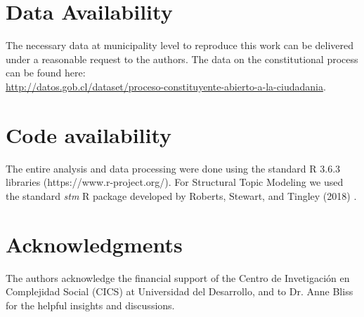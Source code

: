 \documentclass[onecolumn]{article}
\begin{document}




\section*{Data Availability}
The necessary data at municipality level to reproduce this work can be delivered under a reasonable request to the authors. The data on the constitutional process can be found here:\\ \url{http://datos.gob.cl/dataset/proceso-constituyente-abierto-a-la-ciudadania}.

\section*{Code availability}
The entire analysis and data processing were done using the standard R 3.6.3 libraries (https://www.r-project.org/). For Structural Topic Modeling we used the standard \textit{stm} R package developed by Roberts, Stewart, and Tingley (2018) \cite{stm}.


\section*{Acknowledgments}
The authors acknowledge the financial support of the Centro de Invetigación en Complejidad Social (CICS) at Universidad del Desarrollo, and to Dr. Anne Bliss for the helpful insights and discussions.
\end{document}
